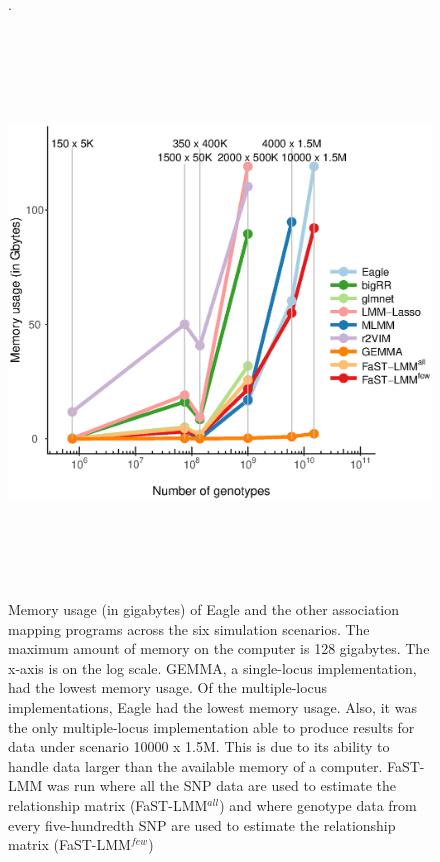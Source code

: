 \documentclass{article}
\begin{document}
\begin{figure}
\caption{Memory usage (in gigabytes) of Eagle and the other association mapping programs across 
the six simulation scenarios. The maximum amount of memory on the computer is 128 gigabytes. 
The x-axis is on the log scale. GEMMA, a single-locus implementation, had the lowest memory usage. 
Of the multiple-locus implementations, Eagle had the lowest memory usage. Also, it 
was the only multiple-locus 
implementation able to produce results for data under  scenario 10000 x 1.5M. This is due to its ability 
to handle data larger than the available memory of a computer. FaST-LMM was run where all the SNP data are used 
to estimate the relationship matrix (FaST-LMM$^{all}$)   and where genotype data from every five-hundredth SNP are used to 
estimate the relationship matrix (FaST-LMM$^{few}$)}.
\label{supfigmem}

\begin{center}
\includegraphics[width=15cm, height=15cm]{mem.eps}
\end{center}
\end{figure}
\end{document}
